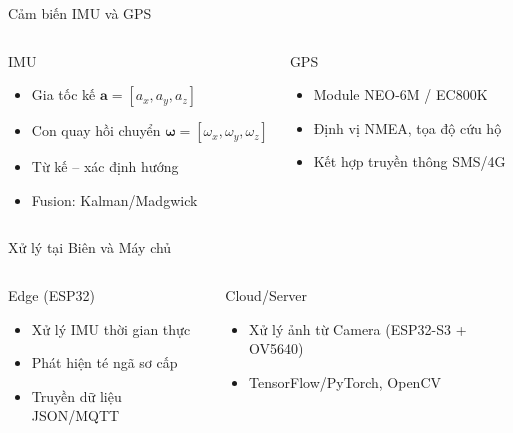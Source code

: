 \begin{frame}{Cảm biến IMU và GPS}
\begin{columns}
\begin{block}{IMU}
\begin{itemize}
\item Gia tốc kế $\mathbf{a}=[a_x,a_y,a_z]$
\item Con quay hồi chuyển $\boldsymbol{\omega}=[\omega_x,\omega_y,\omega_z]$
\item Từ kế – xác định hướng
\item Fusion: Kalman/Madgwick
\end{itemize}
\end{block}

\begin{exampleblock}{GPS}
\begin{itemize}
\item Module NEO-6M / EC800K
\item Định vị NMEA, tọa độ cứu hộ
\item Kết hợp truyền thông SMS/4G
\end{itemize}
\end{exampleblock}
\end{columns}
\end{frame}


\begin{frame}{Xử lý tại Biên và Máy chủ }
\begin{columns}
\begin{block}{Edge (ESP32)}
\begin{itemize}
\item Xử lý IMU thời gian thực
\item Phát hiện té ngã sơ cấp
\item Truyền dữ liệu JSON/MQTT
\end{itemize}
\end{block}

\begin{block}{Cloud/Server}
\begin{itemize}
\item Xử lý ảnh từ Camera (ESP32-S3 + OV5640)
\item TensorFlow/PyTorch, OpenCV
\end{itemize}
\end{block}
\end{columns}
\end{frame}
\fi

